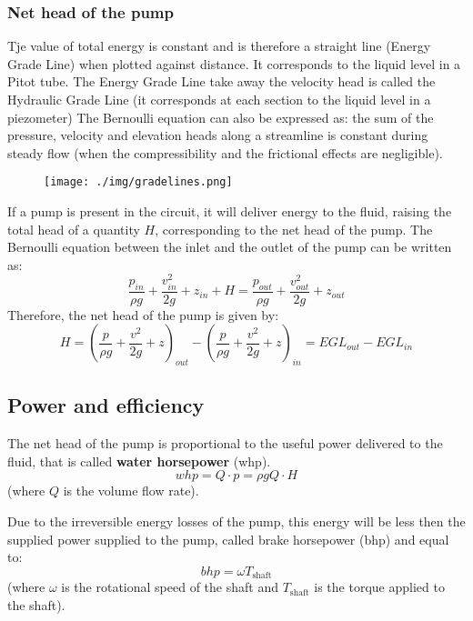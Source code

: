 \subsubsection{Net head of the pump}
Tje value of total energy is constant and is therefore a straight line (Energy Grade Line) when plotted against distance. It corresponds to the liquid level in a Pitot tube. The Energy Grade Line take away the velocity head is called the Hydraulic Grade Line (it corresponds at each section to the liquid level in a piezometer)
The Bernoulli equation can also be expressed as: the sum of the pressure, velocity and elevation heads along a streamline is constant during steady flow (when the compressibility and the frictional effects are negligible).
\begin{figure}[H]
  \centering
  \texttt{[image: ./img/gradelines.png]}
\end{figure}
If a pump is present in the circuit, it will deliver energy to the fluid, raising the total head of a quantity $H$, corresponding to the net head of the pump. The Bernoulli equation between the inlet and the outlet of the pump can be written as:
\begin{equation}
  \frac{p_{in}}{\rho g} + \frac{v_{in}^2}{2g} + z_{in} + H = \frac{p_{out}}{\rho g} + \frac{v_{out}^2}{2g} + z_{out}
\end{equation}
Therefore, the net head of the pump is given by:
\begin{equation}
  H = \left( \frac{p}{\rho g} + \frac{v^2}{2g} +z \right)_{out} - \left( \frac{p}{\rho g} + \frac{v^2}{2g} +z \right)_{in} = EGL_{out} - EGL_{in}
\end{equation}
\subsection{Power and efficiency}
The net head of the pump is proportional to the useful power delivered to the fluid, that is called \textbf{water horsepower} (whp).
\begin{equation}
  whp = Q\cdot p = \rho g Q\cdot H
\end{equation}
(where $Q$ is the volume flow rate).

Due to the irreversible energy losses of the pump, this energy will be less then the supplied power supplied to the pump, called brake horsepower (bhp) and equal to:
\begin{equation}
  bhp = \omega T_{\textrm{shaft}}
\end{equation}
(where $\omega$ is the rotational speed of the shaft and $T_{\textrm{shaft}}$ is the torque applied to the shaft).

